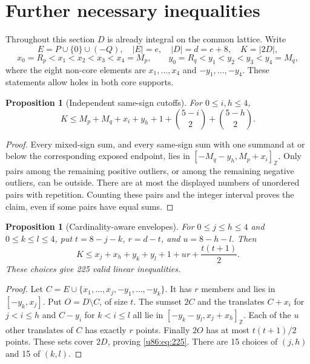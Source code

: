 \documentclass[11pt,a4paper]{article}
\newtheorem{proposition}[theorem]{Proposition}
\theoremstyle{remark}
\newcommand{\Z}{\mathbb Z}
\begin{document}
\section{Further necessary inequalities}\label{u86:sec:cuts}
Throughout this section $D$ is already integral on the common lattice.
Write
\[
 E=P\cup\{0\}\cup(-Q),\quad |E|=e,\quad |D|=d=e+8,\quad K=|2D|,
\]
\[
 x_0=R_p<x_1<x_2<x_3<x_4=M_p,\qquad
 y_0=R_q<y_1<y_2<y_3<y_4=M_q,
\]
where the eight non-core elements are $x_1,\ldots,x_4$ and
$-y_1,\ldots,-y_4$. These statements allow holes in both core supports.

\begin{proposition}[Independent same-sign cutoffs]\label{u86:prop:tails}
For $0\le i,h\le4$,
\[
 K\le M_p+M_q+x_i+y_h+1+\binom{5-i}{2}+\binom{5-h}{2}.
\]
\end{proposition}
\begin{proof}
Every mixed-sign sum, and every same-sign sum with one summand at or
below the corresponding exposed endpoint, lies in
$[-M_q-y_h,M_p+x_i]_{\Z}$. Only pairs among the remaining positive
outliers, or among the remaining negative outliers, can be outside.
There are at most the displayed numbers of unordered pairs with
repetition. Counting these pairs and the integer interval proves the
claim, even if some pairs have equal sums.
\end{proof}

\begin{proposition}[Cardinality-aware envelopes]\label{u86:prop:225}
For $0\le j\le h\le4$ and $0\le k\le l\le4$, put
$t=8-j-k$, $r=d-t$, and $u=8-h-l$. Then
\begin{equation}\label{u86:eq:225}
 K\le x_j+x_h+y_k+y_l+1+ur+\frac{t(t+1)}2.
\end{equation}
These choices give 225 valid linear inequalities.
\end{proposition}
\begin{proof}
Let $C=E\cup\{x_1,\ldots,x_j,-y_1,\ldots,-y_k\}$. It has $r$ members
and lies in $[-y_k,x_j]$. Put $O=D\setminus C$, of size $t$.
The sumset $2C$ and the translates $C+x_i$ for $j<i\le h$ and
$C-y_i$ for $k<i\le l$ all lie in
$[-y_k-y_l,x_j+x_h]_{\Z}$. Each of the $u$ other translates of $C$ has
exactly $r$ points. Finally $2O$ has at most $t(t+1)/2$ points.
These sets cover $2D$, proving \eqref{u86:eq:225}. There are 15 choices of
$(j,h)$ and 15 of $(k,l)$.
\end{proof}
\end{document}
